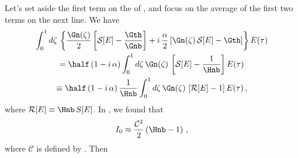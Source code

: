 Let's set aside the first term on the \rhs of , and focus on the average of the first two terms on the next line. We have
\begin{multline}
    \int_{0}^{1} d \zeta\, \left\{\frac{\Gn(\zeta)}{2} \left[ \mathcal{S}[E] - \frac{\Gth}{\Gnb}\right]
    + i\, \frac{\alpha}{2} \left[ \Gn(\zeta)\, \mathcal{S}[E] - \Gth \right] \right\}E(\tau) \\
    = \half\, (1 - i\, \alpha) \int_{0}^{1} d \zeta\, \Gn(\zeta)\, \left[ \mathcal{S}[E] - \frac{1}{\Hnb} \right] E(\tau) \\
    \equiv \half\, (1 - i\, \alpha)\, \frac{1}{\Hnb} \int_{0}^{1} d \zeta\, \Gn(\zeta)\, \left[ \mathcal{R}[E] - 1 \right] E(\tau)\, ,
\end{multline}
where $\mathcal{R}[E] \equiv \Hnb\, S[E]$. In , we found that
\begin{equation}
    I_0 \approx \frac{\mathcal{C}^2}{2} \left( \Hnb  - 1 \right)\, ,
\end{equation}
where $\mathcal{C}$ is defined by . Then
